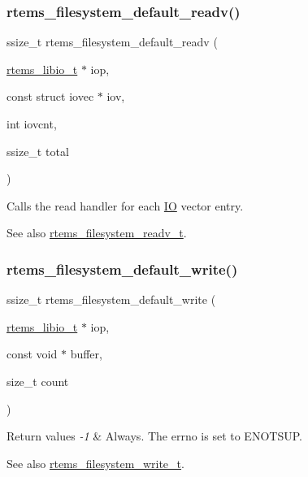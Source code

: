 \subsubsection{\texorpdfstring{rtems\_filesystem\_default\_readv()}{rtems\_filesystem\_default\_readv()}}
{\footnotesize\ttfamily ssize\+\_\+t rtems\+\_\+filesystem\+\_\+default\+\_\+readv (\begin{DoxyParamCaption}\item[{\mbox{\hyperlink{structrtems__libio__tt}{rtems\+\_\+libio\+\_\+t}} $\ast$}]{iop,  }\item[{const struct iovec $\ast$}]{iov,  }\item[{int}]{iovcnt,  }\item[{ssize\+\_\+t}]{total }\end{DoxyParamCaption})}



Calls the read handler for each \mbox{\hyperlink{structIO}{IO}} vector entry. 

\begin{DoxySeeAlso}{See also}
\mbox{\hyperlink{group__LibIOFSHandler_gae6ccf9c319ab60636be036e7437f8dd7}{rtems\+\_\+filesystem\+\_\+readv\+\_\+t}}. 
\end{DoxySeeAlso}
\mbox{\label{group__LibIOFSHandler_gaf4201385a0dd5ad3d1f447b3a167b106}} 
\subsubsection{\texorpdfstring{rtems\_filesystem\_default\_write()}{rtems\_filesystem\_default\_write()}}
{\footnotesize\ttfamily ssize\+\_\+t rtems\+\_\+filesystem\+\_\+default\+\_\+write (\begin{DoxyParamCaption}\item[{\mbox{\hyperlink{structrtems__libio__tt}{rtems\+\_\+libio\+\_\+t}} $\ast$}]{iop,  }\item[{const void $\ast$}]{buffer,  }\item[{size\+\_\+t}]{count }\end{DoxyParamCaption})}


\begin{DoxyRetVals}{Return values}
{\em -\/1} & Always. The errno is set to E\+N\+O\+T\+S\+UP.\\
\hline
\end{DoxyRetVals}
\begin{DoxySeeAlso}{See also}
\mbox{\hyperlink{group__LibIOFSHandler_gacbc1d51a1699693e340b3e31f7f62611}{rtems\+\_\+filesystem\+\_\+write\+\_\+t}}. 
\end{DoxySeeAlso}
\mbox{\label{group__LibIOFSHandler_ga9ac1157e2bd2cff626d67f67a6376a8f}} 
